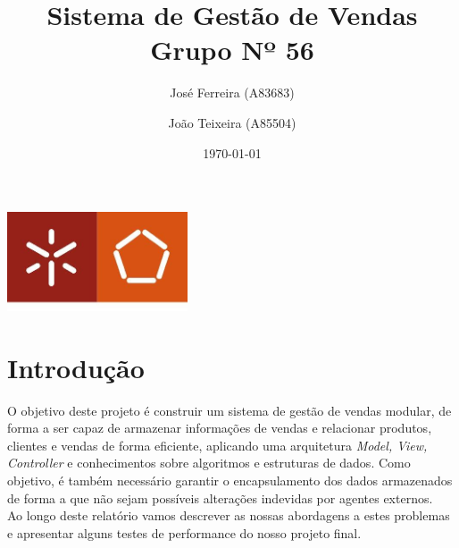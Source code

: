 \documentclass[a4paper]{report}
\begin{document}
\title{Sistema de Gestão de Vendas\\ 
\large Grupo Nº 56}
\author{José Ferreira (A83683) \and João Teixeira (A85504)}
\date{\today}

\begin{center}
    \begin{minipage}{0.75\linewidth}
        \centering
        \includegraphics[width=0.4\textwidth]{eng.jpeg}\par\vspace{1cm}
        \vspace{1.5cm}
        \href{https://www.uminho.pt/PT}
        {\color{black}{\scshape\LARGE Universidade do Minho}} \par
        \vspace{1cm}
        \href{https://www.di.uminho.pt/}
        {\color{black}{\scshape\Large Departamento de Informática}} \par
        \vspace{1.5cm}
        \maketitle
    \end{minipage}
\end{center}

\tableofcontents

\pagebreak

\chapter{Introdução}

O objetivo deste projeto é construir um sistema de gestão de vendas modular,
de forma a ser capaz de armazenar informações de vendas e relacionar produtos,
clientes e vendas de forma eficiente, aplicando uma arquitetura \textit{Model, View,
Controller} e conhecimentos sobre algoritmos e estruturas de dados. Como objetivo, 
é também necessário garantir o encapsulamento dos dados armazenados de forma
a que não sejam possíveis alterações indevidas por agentes externos.\\
Ao longo deste relatório vamos descrever as nossas abordagens a estes problemas e
apresentar alguns testes de performance do nosso projeto final.
\end{document}
